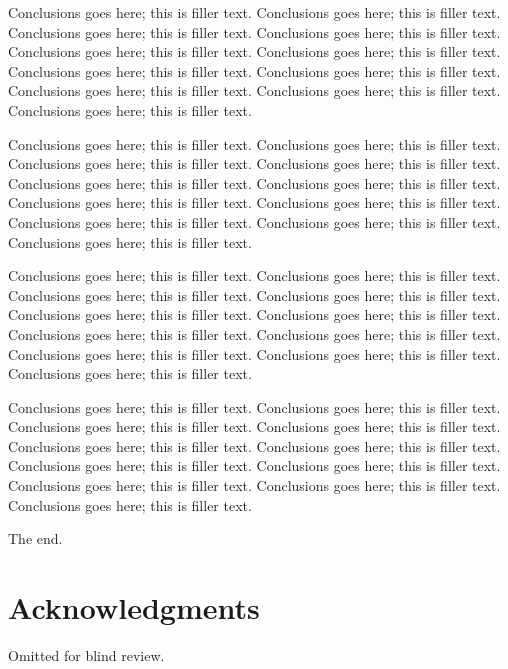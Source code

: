 \documentclass{sig-alternate}
\begin{document}
Conclusions goes here; this is filler text. Conclusions goes here; this is filler text. Conclusions goes here; this is filler text. Conclusions goes here; this is filler text. Conclusions goes here; this is filler text. Conclusions goes here; this is filler text. Conclusions goes here; this is filler text. Conclusions goes here; this is filler text. Conclusions goes here; this is filler text. Conclusions goes here; this is filler text. Conclusions goes here; this is filler text. 

Conclusions goes here; this is filler text. Conclusions goes here; this is filler text. Conclusions goes here; this is filler text. Conclusions goes here; this is filler text. Conclusions goes here; this is filler text. Conclusions goes here; this is filler text. Conclusions goes here; this is filler text. Conclusions goes here; this is filler text. Conclusions goes here; this is filler text. Conclusions goes here; this is filler text. Conclusions goes here; this is filler text. 

Conclusions goes here; this is filler text. Conclusions goes here; this is filler text. Conclusions goes here; this is filler text. Conclusions goes here; this is filler text. Conclusions goes here; this is filler text. Conclusions goes here; this is filler text. Conclusions goes here; this is filler text. Conclusions goes here; this is filler text. Conclusions goes here; this is filler text. Conclusions goes here; this is filler text. Conclusions goes here; this is filler text. 

Conclusions goes here; this is filler text. Conclusions goes here; this is filler text. Conclusions goes here; this is filler text. Conclusions goes here; this is filler text. Conclusions goes here; this is filler text. Conclusions goes here; this is filler text. Conclusions goes here; this is filler text. Conclusions goes here; this is filler text. Conclusions goes here; this is filler text. Conclusions goes here; this is filler text. Conclusions goes here; this is filler text. 

The end.


\section{Acknowledgments}
Omitted for blind review.
\end{document}

